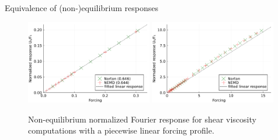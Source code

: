 \begin{subsection}{Equivalence of (non-)equilibrium responses}
    \begin{figure}
        \centering
        \includegraphics[width=0.49\textwidth]{figures/04/shears_lin_linear.pdf}
        \includegraphics[width=0.49\textwidth]{figures/04/shears_nonlin_linear.pdf}
        \caption[]{Non-equilibrium normalized Fourier response for shear viscosity computations with a piecewise linear forcing profile.}
        \label{04:fig:sv_linear}
    \end{figure}


\end{subsection}
